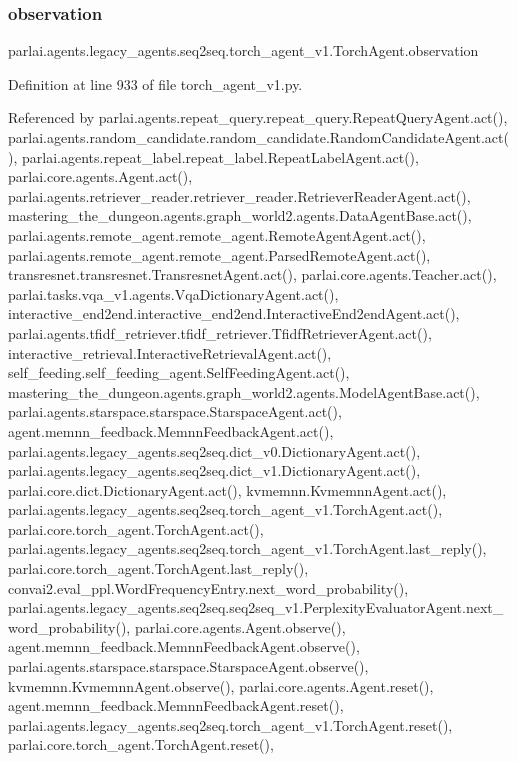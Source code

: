 \subsubsection{\texorpdfstring{observation}{observation}}
{\footnotesize\ttfamily parlai.\+agents.\+legacy\+\_\+agents.\+seq2seq.\+torch\+\_\+agent\+\_\+v1.\+Torch\+Agent.\+observation}



Definition at line 933 of file torch\+\_\+agent\+\_\+v1.\+py.



Referenced by parlai.\+agents.\+repeat\+\_\+query.\+repeat\+\_\+query.\+Repeat\+Query\+Agent.\+act(), parlai.\+agents.\+random\+\_\+candidate.\+random\+\_\+candidate.\+Random\+Candidate\+Agent.\+act(), parlai.\+agents.\+repeat\+\_\+label.\+repeat\+\_\+label.\+Repeat\+Label\+Agent.\+act(), parlai.\+core.\+agents.\+Agent.\+act(), parlai.\+agents.\+retriever\+\_\+reader.\+retriever\+\_\+reader.\+Retriever\+Reader\+Agent.\+act(), mastering\+\_\+the\+\_\+dungeon.\+agents.\+graph\+\_\+world2.\+agents.\+Data\+Agent\+Base.\+act(), parlai.\+agents.\+remote\+\_\+agent.\+remote\+\_\+agent.\+Remote\+Agent\+Agent.\+act(), parlai.\+agents.\+remote\+\_\+agent.\+remote\+\_\+agent.\+Parsed\+Remote\+Agent.\+act(), transresnet.\+transresnet.\+Transresnet\+Agent.\+act(), parlai.\+core.\+agents.\+Teacher.\+act(), parlai.\+tasks.\+vqa\+\_\+v1.\+agents.\+Vqa\+Dictionary\+Agent.\+act(), interactive\+\_\+end2end.\+interactive\+\_\+end2end.\+Interactive\+End2end\+Agent.\+act(), parlai.\+agents.\+tfidf\+\_\+retriever.\+tfidf\+\_\+retriever.\+Tfidf\+Retriever\+Agent.\+act(), interactive\+\_\+retrieval.\+Interactive\+Retrieval\+Agent.\+act(), self\+\_\+feeding.\+self\+\_\+feeding\+\_\+agent.\+Self\+Feeding\+Agent.\+act(), mastering\+\_\+the\+\_\+dungeon.\+agents.\+graph\+\_\+world2.\+agents.\+Model\+Agent\+Base.\+act(), parlai.\+agents.\+starspace.\+starspace.\+Starspace\+Agent.\+act(), agent.\+memnn\+\_\+feedback.\+Memnn\+Feedback\+Agent.\+act(), parlai.\+agents.\+legacy\+\_\+agents.\+seq2seq.\+dict\+\_\+v0.\+Dictionary\+Agent.\+act(), parlai.\+agents.\+legacy\+\_\+agents.\+seq2seq.\+dict\+\_\+v1.\+Dictionary\+Agent.\+act(), parlai.\+core.\+dict.\+Dictionary\+Agent.\+act(), kvmemnn.\+Kvmemnn\+Agent.\+act(), parlai.\+agents.\+legacy\+\_\+agents.\+seq2seq.\+torch\+\_\+agent\+\_\+v1.\+Torch\+Agent.\+act(), parlai.\+core.\+torch\+\_\+agent.\+Torch\+Agent.\+act(), parlai.\+agents.\+legacy\+\_\+agents.\+seq2seq.\+torch\+\_\+agent\+\_\+v1.\+Torch\+Agent.\+last\+\_\+reply(), parlai.\+core.\+torch\+\_\+agent.\+Torch\+Agent.\+last\+\_\+reply(), convai2.\+eval\+\_\+ppl.\+Word\+Frequency\+Entry.\+next\+\_\+word\+\_\+probability(), parlai.\+agents.\+legacy\+\_\+agents.\+seq2seq.\+seq2seq\+\_\+v1.\+Perplexity\+Evaluator\+Agent.\+next\+\_\+word\+\_\+probability(), parlai.\+core.\+agents.\+Agent.\+observe(), agent.\+memnn\+\_\+feedback.\+Memnn\+Feedback\+Agent.\+observe(), parlai.\+agents.\+starspace.\+starspace.\+Starspace\+Agent.\+observe(), kvmemnn.\+Kvmemnn\+Agent.\+observe(), parlai.\+core.\+agents.\+Agent.\+reset(), agent.\+memnn\+\_\+feedback.\+Memnn\+Feedback\+Agent.\+reset(), parlai.\+agents.\+legacy\+\_\+agents.\+seq2seq.\+torch\+\_\+agent\+\_\+v1.\+Torch\+Agent.\+reset(), parlai.\+core.\+torch\+\_\+agent.\+Torch\+Agent.\+reset(), 